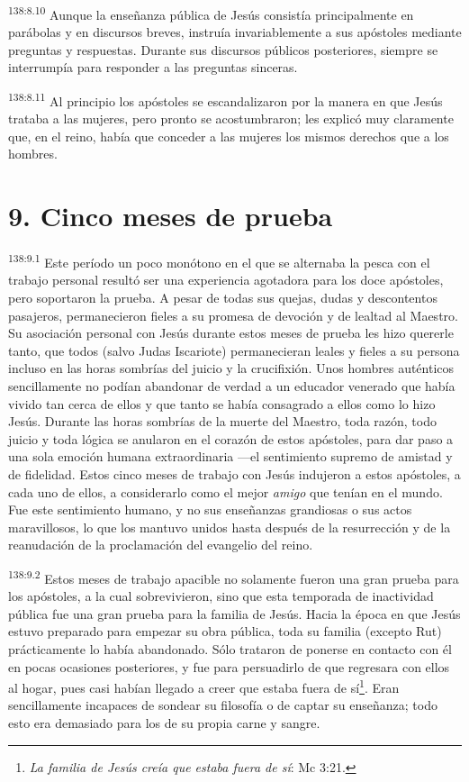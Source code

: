 \par 
\textsuperscript{138:8.10} Aunque la enseñanza pública de Jesús consistía principalmente en parábolas y en discursos breves, instruía invariablemente a sus apóstoles mediante preguntas y respuestas. Durante sus discursos públicos posteriores, siempre se interrumpía para responder a las preguntas sinceras.

\par 
\textsuperscript{138:8.11} Al principio los apóstoles se escandalizaron por la manera en que Jesús trataba a las mujeres, pero pronto se acostumbraron; les explicó muy claramente que, en el reino, había que conceder a las mujeres los mismos derechos que a los hombres.

\section*{9. Cinco meses de prueba}
\par 
\textsuperscript{138:9.1} Este período un poco monótono en el que se alternaba la pesca con el trabajo personal resultó ser una experiencia agotadora para los doce apóstoles, pero soportaron la prueba. A pesar de todas sus quejas, dudas y descontentos pasajeros, permanecieron fieles a su promesa de devoción y de lealtad al Maestro. Su asociación personal con Jesús durante estos meses de prueba les hizo quererle tanto, que todos
(salvo Judas Iscariote) permanecieran leales y fieles a su persona incluso en las horas sombrías del juicio y la crucifixión. Unos hombres auténticos sencillamente no podían abandonar de verdad a un educador venerado que había vivido tan cerca de ellos y que tanto se había consagrado a ellos como lo hizo Jesús. Durante las horas sombrías de la muerte del Maestro, toda razón, todo juicio y toda lógica se anularon en el corazón de estos apóstoles, para dar paso a una sola emoción humana extraordinaria ---el sentimiento supremo de amistad y de fidelidad. Estos cinco meses de trabajo con Jesús indujeron a estos apóstoles, a cada uno de ellos, a considerarlo como el mejor \textit{amigo} que tenían en el mundo. Fue este sentimiento humano, y no sus enseñanzas grandiosas o sus actos maravillosos, lo que los mantuvo unidos hasta después de la resurrección y de la reanudación de la proclamación del evangelio del reino.

\par 
\textsuperscript{138:9.2} Estos meses de trabajo apacible no solamente fueron una gran prueba para los apóstoles, a la cual sobrevivieron, sino que esta temporada de inactividad pública fue una gran prueba para la familia de Jesús. Hacia la época en que Jesús estuvo preparado para empezar su obra pública, toda su familia (excepto Rut) prácticamente lo había abandonado. Sólo trataron de ponerse en contacto con él en pocas ocasiones posteriores, y fue para persuadirlo de que regresara con ellos al hogar, pues casi habían llegado a creer que estaba fuera de sí\footnote{\textit{La familia de Jesús creía que estaba fuera de sí}: Mc 3:21.}. Eran sencillamente incapaces de sondear su filosofía o de captar su enseñanza; todo esto era demasiado para los de su propia carne y sangre.

